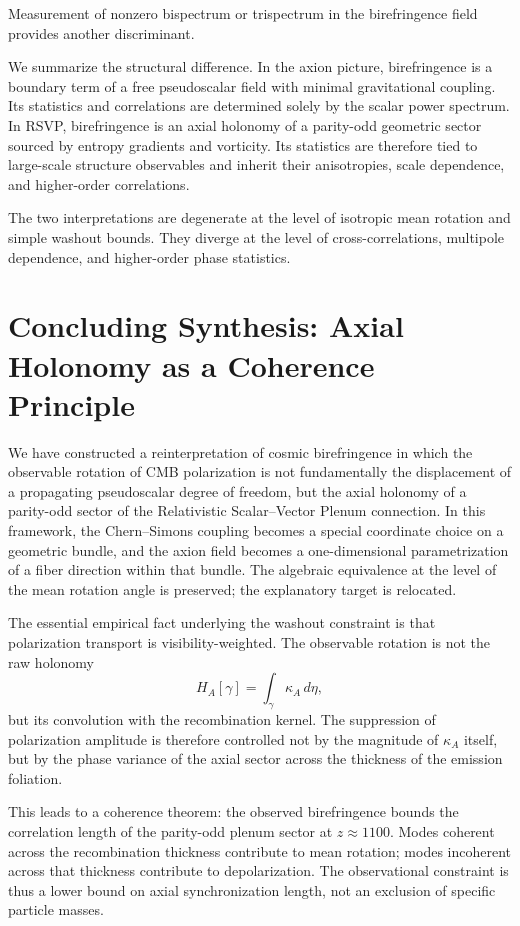 \documentclass[12pt]{article}
\begin{document}
Measurement of nonzero bispectrum or trispectrum in the birefringence field provides another discriminant.

\medskip

We summarize the structural difference. In the axion picture, birefringence is a boundary term of a free pseudoscalar field with minimal gravitational coupling. Its statistics and correlations are determined solely by the scalar power spectrum. In RSVP, birefringence is an axial holonomy of a parity-odd geometric sector sourced by entropy gradients and vorticity. Its statistics are therefore tied to large-scale structure observables and inherit their anisotropies, scale dependence, and higher-order correlations.

The two interpretations are degenerate at the level of isotropic mean rotation and simple washout bounds. They diverge at the level of cross-correlations, multipole dependence, and higher-order phase statistics.

\newpage
\section{Concluding Synthesis: Axial Holonomy as a Coherence Principle}

We have constructed a reinterpretation of cosmic birefringence in which the observable rotation of CMB polarization is not fundamentally the displacement of a propagating pseudoscalar degree of freedom, but the axial holonomy of a parity-odd sector of the Relativistic Scalar--Vector Plenum connection. In this framework, the Chern--Simons coupling becomes a special coordinate choice on a geometric bundle, and the axion field becomes a one-dimensional parametrization of a fiber direction within that bundle. The algebraic equivalence at the level of the mean rotation angle is preserved; the explanatory target is relocated.

The essential empirical fact underlying the washout constraint is that polarization transport is visibility-weighted. The observable rotation is not the raw holonomy
\begin{equation}
H_A[\gamma]
=
\int_{\gamma} \kappa_A \, d\eta,
\end{equation}
but its convolution with the recombination kernel. The suppression of polarization amplitude is therefore controlled not by the magnitude of $\kappa_A$ itself, but by the phase variance of the axial sector across the thickness of the emission foliation.

This leads to a coherence theorem: the observed birefringence bounds the correlation length of the parity-odd plenum sector at $z \approx 1100$. Modes coherent across the recombination thickness contribute to mean rotation; modes incoherent across that thickness contribute to depolarization. The observational constraint is thus a lower bound on axial synchronization length, not an exclusion of specific particle masses.
\end{document}
